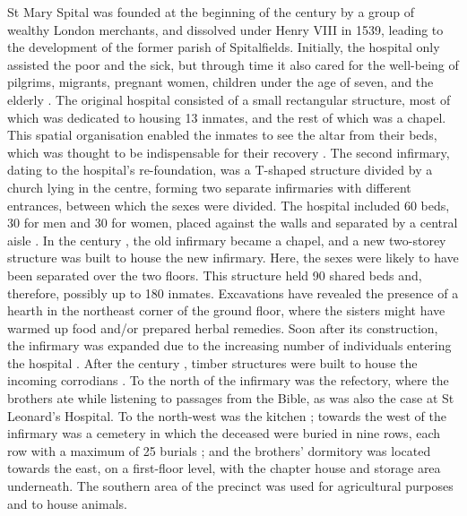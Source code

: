 \documentclass[%
	]{ijsra}
\begin{document}
St Mary Spital was founded at the beginning of the  century \AD by a group of wealthy London merchants, and dissolved under Henry VIII in 1539, leading to the development of the former parish of Spitalfields. Initially, the hospital only assisted the poor and the sick, but through time it also cared for the well-being of pilgrims, migrants, pregnant women, children under the age of seven, and the elderly \parencites[26]{Phillpotts_1997}[48-49]{Thomas_2002}{Unknown_1957}[60-61]{White_2007}.
The original hospital consisted of a small rectangular structure, most of which was dedicated to housing 13 inmates, and the rest of which was a chapel. This spatial organisation enabled the inmates to see the altar from their beds, which was thought to be indispensable for their recovery \parencites[91]{Phillpotts_1997}[98]{Thomas_2002}.
The second infirmary, dating to the hospital’s re-foundation, was a T-shaped structure divided by a church lying in the centre, forming two separate infirmaries with different entrances, between which the sexes were divided. The hospital included 60 beds, 30 for men and 30 for women, placed against the walls and separated by a central aisle \parencites[37]{Phillpotts_1997}[99]{Thomas_2002}. 
In the  century \AD, the old infirmary became a chapel, and a new two-storey structure was built to house the new infirmary. Here, the sexes were likely to have been separated over the two floors. This structure held 90 shared beds and, therefore, possibly up to 180 inmates.
Excavations have revealed the presence of a hearth in the northeast corner of the ground floor, where the sisters might have warmed up food and/or prepared herbal remedies. Soon after its construction, the infirmary was expanded due to the increasing number of individuals entering the hospital \parencites[47]{Phillpotts_1997}[99]{Thomas_2002}[59]{White_2007}. 
After the  century \AD, timber structures were built to house the incoming corrodians \parencite[104,152]{Thomas_2002}.
To the north of the infirmary was the refectory, where the brothers ate while listening to passages from the Bible, as was also the case at St Leonard’s Hospital. 
To the north-west was the kitchen \parencites[51]{Phillpotts_1997}[100]{Thomas_2002}; 
towards the west of the infirmary was a cemetery in which the deceased were buried in nine rows, each row with a maximum of 25 burials \parencite[59]{White_2007}; and the brothers’ dormitory was located towards the east, on a first-floor level, with the chapter house and storage area underneath. The southern area of the precinct was used for agricultural purposes and to house animals.
\end{document}
